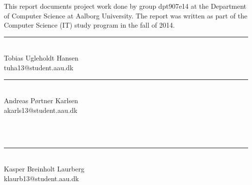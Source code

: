 \makeatletter {}\makeatother
{}
This report documents project work done by group dpt907e14 at the Department of Computer Science at Aalborg University. The report was written as part of the Computer Science (IT) study program in the fall of 2014.


\newpage
\vspace*{30 mm}
\begin{vplace}

\begin{minipage}[b]{0.45\textwidth}
 \centering
 \rule{\textwidth}{0.5pt}\\
  Tobias Ugleholdt Hansen\\
 {\footnotesize tuha13@student.aau.dk}
\end{minipage}
\begin{minipage}[b]{0.45\textwidth}
 \centering
 \rule{\textwidth}{0.5pt}\\
  Andreas Pørtner Karlsen\\
 {\footnotesize akarls13@student.aau.dk}
\end{minipage}\\\\
\begin{minipage}[b]{0.45\textwidth}
 \centering
 \rule{\textwidth}{0.5pt}\\
  Kasper Breinholt Laurberg\\
 {\footnotesize klaurb13@student.aau.dk}
\end{minipage}\\\\


\end{vplace}
\worksheetend
